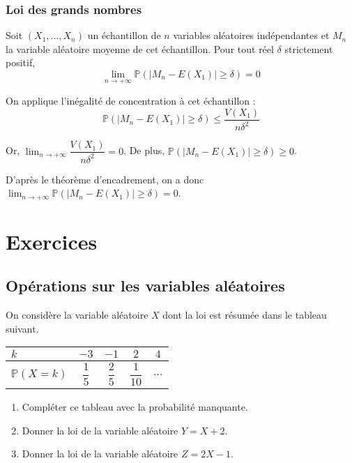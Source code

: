 \documentclass[11pt,fleqn, openany]{book} %
\begin{document}
\subsection{Loi des grands nombres}

\begin{theorem} Soit $(X_1,...,X_n)$ un échantillon de $n$ variables aléatoires indépendantes et $M_n$ la variable aléatoire moyenne de cet échantillon. Pour tout réel $\delta$ strictement positif,
\[ \displaystyle \lim_{n \to + \infty} \mathbb{P}(|M_n-E(X_1)|\geqslant \delta )=0\]\end{theorem}

\begin{demonstration}On applique l'inégalité de concentration à cet échantillon :
\[ \mathbb{P}(|M_n-E(X_1)|\geqslant \delta ) \leqslant \dfrac{V(X_1)}{n\delta^2}\]

Or, $\displaystyle \lim _{n \to + \infty} \dfrac{V(X_1)}{n\delta^2}=0$. De plus, $\mathbb{P}(|M_n-E(X_1)|\geqslant \delta ) \geqslant 0$. 

D'après le théorème d'encadrement, on a donc  $\displaystyle \lim_{n \to + \infty} \mathbb{P}(|M_n-E(X_1)|\geqslant \delta )=0$.\end{demonstration}

\chapter{Exercices}


\section*{Opérations sur les variables aléatoires}

\begin{exercise}[topic=lgn01]On considère la variable aléatoire $X$ dont la loi est résumée dans le tableau suivant.

\begin{minipage}{0.35\linewidth}
\renewcommand{\arraystretch}{2.2}
\begin{center}
\begin{tabular}{|l|c|c|c|c|}
\hline
$k$ & $-3$& $-1$ & $2$ & $4$ \\
\hline
$\mathbb{P}(X=k)$ & $\dfrac{1}{5}$ & $\dfrac{2}{5}$ & $\dfrac{1}{10}$   & $\dots$ \\
\hline \end{tabular}
\end{center}\end{minipage}\begin{minipage}{0.58\linewidth}

\begin{enumerate}
\item Compléter ce tableau avec la probabilité manquante.
\item Donner la loi de la variable aléatoire $Y=X+2$.
\item Donner la loi de la variable aléatoire $Z=2X-1$.
\end{enumerate}\end{minipage}\end{exercise}
\end{document}

